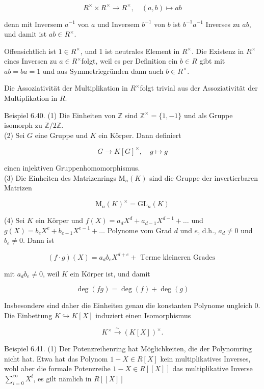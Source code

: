 \documentclass[10pt, letterpaper]{article}
\begin{document}
$$
R^{\times} \times R^{\times} \rightarrow R^{\times}, \quad(a, b) \mapsto a b
$$

denn mit Inversem $a^{-1}$ von $a$ und Inversem $b^{-1}$ von $b$ ist $b^{-1} a^{-1}$ Inverses zu $a b$, und damit ist $a b \in R^{\times}$.

Offensichtlich ist $1 \in R^{\times}$, und 1 ist neutrales Element in $R^{\times}$. Die Existenz in $R^{\times}$eines Inversen zu $a \in R^{\times}$folgt, weil es per Definition ein $b \in R$ gibt mit $a b=b a=1$ und aus Symmetriegründen dann auch $b \in R^{\times}$.

Die Assoziativität der Multiplikation in $R^{\times}$folgt trivial aus der Assoziativität der Multiplikation in $R$.

Beispiel 6.40. (1) Die Einheiten von $\mathbb{Z}$ sind $\mathbb{Z}^{\times}=\{1,-1\}$ und als Gruppe isomorph zu $\mathbb{Z} / 2 \mathbb{Z}$.\\
(2) Sei $G$ eine Gruppe und $K$ ein Körper. Dann definiert

$$
G \rightarrow K[G]^{\times}, \quad g \mapsto g
$$

einen injektiven Gruppenhomomorphismus.\\
(3) Die Einheiten des Matrizenrings $\mathrm{M}_{n}(K)$ sind die Gruppe der invertierbaren Matrizen

$$
\mathrm{M}_{n}(K)^{\times}=\mathrm{GL}_{n}(K)
$$

(4) Sei $K$ ein Körper und $f(X)=a_{d} X^{d}+a_{d-1} X^{d-1}+\ldots$ und $g(X)=b_{e} X^{e}+b_{e-1} X^{e-1}+\ldots$ Polynome vom Grad $d$ und $e$, d.h., $a_{d} \neq 0$ und $b_{e} \neq 0$. Dann ist

$$
(f \cdot g)(X)=a_{d} b_{e} X^{d+e}+\text { Terme kleineren Grades }
$$

mit $a_{d} b_{e} \neq 0$, weil $K$ ein Körper ist, und damit

$$
\operatorname{deg}(f g)=\operatorname{deg}(f)+\operatorname{deg}(g)
$$

Insbesondere sind daher die Einheiten genau die konstanten Polynome ungleich 0. Die Einbettung $K \hookrightarrow K[X]$ induziert einen Isomorphismus

$$
K^{\times} \xrightarrow{\sim}(K[X])^{\times} .
$$

Beispiel 6.41. (1) Der Potenzreihenring hat Möglichkeiten, die der Polynomring nicht hat. Etwa hat das Polynom $1-X \in R[X]$ kein multiplikatives Inverses, wohl aber die formale Potenzreihe $1-X \in R[[X]]$ das multiplikative Inverse $\sum_{i=0}^{\infty} X^{i}$, es gilt nämlich in $R[[X]]$
\end{document}
